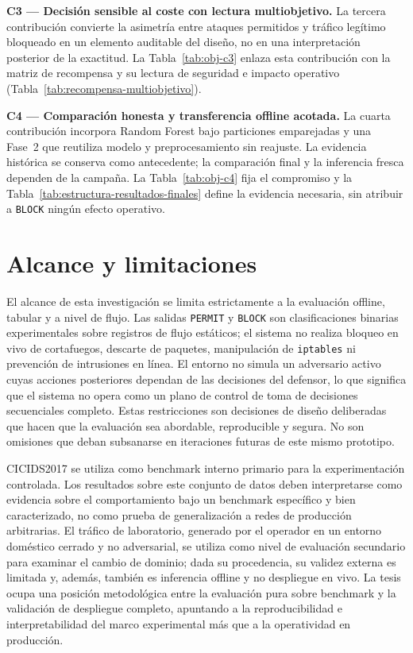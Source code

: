 \textbf{C3 --- Decisión sensible al coste con lectura multiobjetivo.} La tercera contribución convierte la asimetría entre ataques permitidos y tráfico legítimo bloqueado en un elemento auditable del diseño, no en una interpretación posterior de la exactitud. La Tabla~\ref{tab:obj-c3} enlaza esta contribución con la matriz de recompensa y su lectura de seguridad e impacto operativo (Tabla~\ref{tab:recompensa-multiobjetivo}).

\textbf{C4 --- Comparación honesta y transferencia offline acotada.} La cuarta contribución incorpora Random Forest bajo particiones emparejadas y una Fase~2 que reutiliza modelo y preprocesamiento sin reajuste. La evidencia histórica se conserva como antecedente; la comparación final y la inferencia fresca dependen de la campaña. La Tabla~\ref{tab:obj-c4} fija el compromiso y la Tabla~\ref{tab:estructura-resultados-finales} define la evidencia necesaria, sin atribuir a \texttt{BLOCK} ningún efecto operativo.

\section{Alcance y limitaciones}
El alcance de esta investigación se limita estrictamente a la evaluación offline, tabular y a nivel de flujo. Las salidas \texttt{PERMIT} y \texttt{BLOCK} son clasificaciones binarias experimentales sobre registros de flujo estáticos; el sistema no realiza bloqueo en vivo de cortafuegos, descarte de paquetes, manipulación de \texttt{iptables} ni prevención de intrusiones en línea. El entorno no simula un adversario activo cuyas acciones posteriores dependan de las decisiones del defensor, lo que significa que el sistema no opera como un plano de control de toma de decisiones secuenciales completo. Estas restricciones son decisiones de diseño deliberadas que hacen que la evaluación sea abordable, reproducible y segura. No son omisiones que deban subsanarse en iteraciones futuras de este mismo prototipo.

CICIDS2017 se utiliza como benchmark interno primario para la experimentación controlada. Los resultados sobre este conjunto de datos deben interpretarse como evidencia sobre el comportamiento bajo un benchmark específico y bien caracterizado, no como prueba de generalización a redes de producción arbitrarias. El tráfico de laboratorio, generado por el operador en un entorno doméstico cerrado y no adversarial, se utiliza como nivel de evaluación secundario para examinar el cambio de dominio; dada su procedencia, su validez externa es limitada y, además, también es inferencia offline y no despliegue en vivo. La tesis ocupa una posición metodológica entre la evaluación pura sobre benchmark y la validación de despliegue completo, apuntando a la reproducibilidad e interpretabilidad del marco experimental más que a la operatividad en producción.

